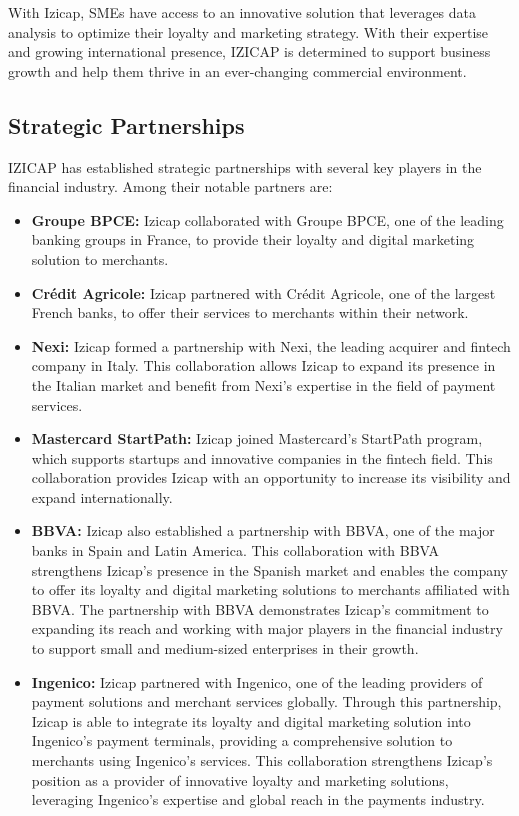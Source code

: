 With Izicap, SMEs have access to an innovative solution that leverages data analysis to optimize their loyalty and marketing strategy. With their expertise and growing international presence, IZICAP is determined to support business growth and help them thrive in an ever-changing commercial environment.
\subsection{Strategic Partnerships}
IZICAP has established strategic partnerships with several key players in the financial industry. Among their notable partners are:
\begin{itemize}
\item \textbf{Groupe BPCE:} Izicap collaborated with Groupe BPCE, one of the leading banking groups in France, to provide their loyalty and digital marketing solution to merchants.
\item \textbf{Crédit Agricole:} Izicap partnered with Crédit Agricole, one of the largest French banks, to offer their services to merchants within their network.
\item \textbf{Nexi:} Izicap formed a partnership with Nexi, the leading acquirer and fintech company in Italy. This collaboration allows Izicap to expand its presence in the Italian market and benefit from Nexi's expertise in the field of payment services.
\item \textbf{Mastercard StartPath:} Izicap joined Mastercard's StartPath program, which supports startups and innovative companies in the fintech field. This collaboration provides Izicap with an opportunity to increase its visibility and expand internationally.
\item \textbf{BBVA:} Izicap also established a partnership with BBVA, one of the major banks in Spain and Latin America. This collaboration with BBVA strengthens Izicap's presence in the Spanish market and enables the company to offer its loyalty and digital marketing solutions to merchants affiliated with BBVA. The partnership with BBVA demonstrates Izicap's commitment to expanding its reach and working with major players in the financial industry to support small and medium-sized enterprises in their growth.
\item \textbf{Ingenico:} Izicap partnered with Ingenico, one of the leading providers of payment solutions and merchant services globally. Through this partnership, Izicap is able to integrate its loyalty and digital marketing solution into Ingenico's payment terminals, providing a comprehensive solution to merchants using Ingenico's services. This collaboration strengthens Izicap's position as a provider of innovative loyalty and marketing solutions, leveraging Ingenico's expertise and global reach in the payments industry.
\end{itemize}
